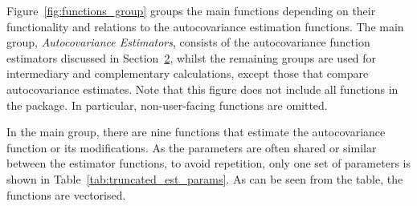 Figure~\ref{fig:functions_group} groups the main functions depending on their functionality and relations to the autocovariance estimation functions.
The main group, \textit{Autocovariance Estimators}, consists of the autocovariance function estimators discussed in Section~\hyperref[sec:nonparametric]{2}, whilst the remaining groups are used for intermediary and complementary calculations, except those that compare autocovariance estimates. Note that this figure does not include all functions in the package. In particular, non-user-facing functions are omitted.

In the main group, there are nine functions that estimate the autocovariance function or its modifications.
As the parameters are often shared or similar between the estimator functions, to avoid repetition, only one set of parameters is shown in Table~\ref{tab:truncated_est_params}. As can be seen from the table, the functions are vectorised.
